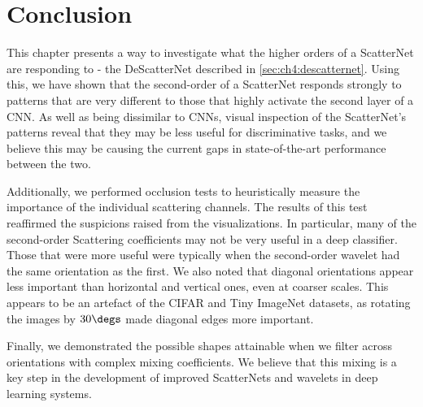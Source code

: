 \section{Conclusion}
This chapter presents a way to investigate what the higher orders of a ScatterNet
are responding to - the DeScatterNet described in \autoref{sec:ch4:descatternet}.
Using this, we have shown that the second-order of a ScatterNet 
responds strongly to patterns that are very different to those that highly activate the
second layer of a CNN\@. As well as being dissimilar to CNNs, visual inspection of the
ScatterNet's patterns reveal that they may be less useful for discriminative
tasks, and we believe this may be causing the current gaps in state-of-the-art
performance between the two. 

Additionally, we performed occlusion tests to heuristically measure the
importance of the individual scattering channels. The results of this test
reaffirmed the suspicions raised from the visualizations. In particular, many of
the second-order Scattering coefficients may not be very useful in a deep
classifier. Those that were more useful were typically when the second-order wavelet
had the same orientation as the first. We also noted that diagonal
orientations appear less important than horizontal and vertical ones, even at
coarser scales. This appears to be an artefact of the CIFAR and Tiny ImageNet
datasets, as rotating the images by $30\degs$ made diagonal edges more
important.

Finally, we demonstrated the possible shapes attainable when we filter
across orientations with complex mixing coefficients. We believe that this 
mixing is a key step in the development of improved ScatterNets and wavelets in deep
learning systems.

